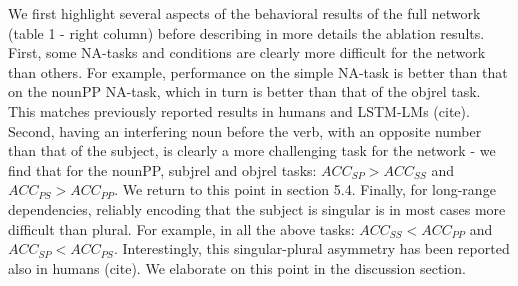 We first highlight several aspects of the behavioral results of the full network (table 1 - right column) before describing in more details the ablation results. 
First, some NA-tasks and conditions are clearly more difficult for the network than others. 
For example, performance on the simple NA-task is better than that on the nounPP NA-task, which in turn is better than that of the objrel task. 
This matches previously reported results in humans and LSTM-LMs (cite). 
Second, having an interfering noun before the verb, with an opposite number than that of the subject, is clearly a more challenging task for the network - we find that for the nounPP, subjrel and objrel tasks: $ACC_{SP}>ACC_{SS}$ and $ACC_{PS}>ACC_{PP}$. 
We return to this point in section 5.4. 
Finally, for long-range dependencies, reliably encoding that the subject is singular is in most cases more difficult than plural. 
For example, in all the above tasks: $ACC_{SS}<ACC_{PP}$ and $ACC_{SP}<ACC_{PS}$. 
Interestingly, this singular-plural asymmetry has been reported also in humans (cite). 
We elaborate on this point in the discussion section.

